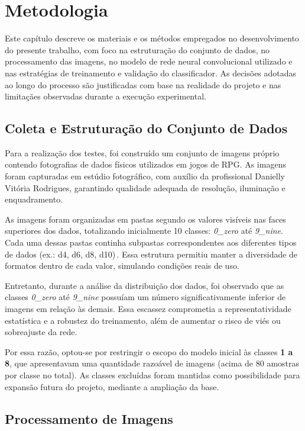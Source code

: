 \section{Metodologia }

Este capítulo descreve os materiais e os métodos empregados no desenvolvimento do presente trabalho, 
com foco na estruturação do conjunto de dados, no processamento das imagens, no modelo de rede neural 
convolucional utilizado e nas estratégias de treinamento e validação do classificador. As decisões 
adotadas ao longo do processo são justificadas com base na realidade do projeto e nas limitaçães 
observadas durante a execução experimental.

\subsection{Coleta e Estruturação do Conjunto de Dados}
Para a realização dos testes, foi construído um conjunto de imagens próprio contendo fotografias de dados 
físicos utilizados em jogos de RPG. As imagens foram capturadas em estúdio fotográfico, com auxílio da
profissional Danielly Vitória Rodrigues, garantindo qualidade adequada de resolução, iluminação e enquadramento.

As imagens foram organizadas em pastas segundo os valores visíveis nas faces superiores dos dados, 
totalizando inicialmente 10 classes: \textit{0\_zero} até \textit{9\_nine}. Cada uma dessas pastas 
continha subpastas correspondentes aos diferentes tipos de dados (ex.: d4, d6, d8, d10)\,. 
Essa estrutura permitiu manter a diversidade de formatos dentro de cada valor, simulando 
condições reais de uso.

Entretanto, durante a análise da distribuição dos dados, foi observado que as classes 
\textit{0\_zero} até \textit{9\_nine} possuíam um número significativamente inferior de 
imagens em relação às demais. Essa escassez comprometia a representatividade estatística 
e a robustez do treinamento, além de aumentar o risco de viés ou sobreajuste da rede.

Por essa razão, optou-se por restringir o escopo do modelo inicial às classes 
\textbf{1 a 8}, que apresentavam uma quantidade razoável de imagens (acima de 80 
amostras por classe no total). As classes excluídas foram mantidas como 
possibilidade para expansão futura do projeto, mediante a ampliação da base.

\subsection{Processamento de Imagens}

